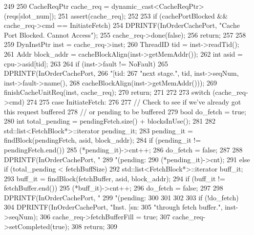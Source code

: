 \begin{DoxyCode}
249 {
250     CacheReqPtr cache_req = dynamic_cast<CacheReqPtr>(reqs[slot_num]);
251     assert(cache_req);
252 
253     if (cachePortBlocked && cache_req->cmd == InitiateFetch) {
254         DPRINTF(InOrderCachePort, "Cache Port Blocked. Cannot Access\n");
255         cache_req->done(false);
256         return;
257     }
258 
259     DynInstPtr inst = cache_req->inst;
260     ThreadID tid = inst->readTid();
261     Addr block_addr = cacheBlockAlign(inst->getMemAddr());
262     int asid = cpu->asid[tid];
263 
264     if (inst->fault != NoFault) {
265         DPRINTF(InOrderCachePort,
266                 "[tid:%
267                 "next stage.\n", tid, inst->seqNum, inst->fault->name(),
268                 cacheBlockAlign(inst->getMemAddr()));
269         finishCacheUnitReq(inst, cache_req);
270         return;
271     }
272 
273     switch (cache_req->cmd)
274     {
275       case InitiateFetch:
276         {
277             // Check to see if we've already got this request buffered
278             // or pending to be buffered
279             bool do_fetch = true;
280             int total_pending = pendingFetch.size() + blocksInUse();
281 
282             std::list<FetchBlock*>::iterator pending_it;
283             pending_it = findBlock(pendingFetch, asid, block_addr);
284             if (pending_it != pendingFetch.end()) {
285                 (*pending_it)->cnt++;
286                 do_fetch = false;
287 
288                 DPRINTF(InOrderCachePort, "%
289                         "(pending:%
290                         (*pending_it)->cnt);
291             } else if (total_pending < fetchBuffSize) {
292                 std::list<FetchBlock*>::iterator buff_it;
293                 buff_it = findBlock(fetchBuffer, asid, block_addr);
294                 if (buff_it != fetchBuffer.end()) {
295                     (*buff_it)->cnt++;
296                     do_fetch = false;
297 
298                     DPRINTF(InOrderCachePort, "%
299                             "(pending:%
300                 }
301             }
302 
303             if (!do_fetch) {
304                 DPRINTF(InOrderCachePort, "Inst. [sn:%
305                         "through fetch buffer.\n", inst->seqNum);
306                 cache_req->fetchBufferFill = true;
307                 cache_req->setCompleted(true);
308                 return;
309             }
}}}
\end{DoxyCode}
